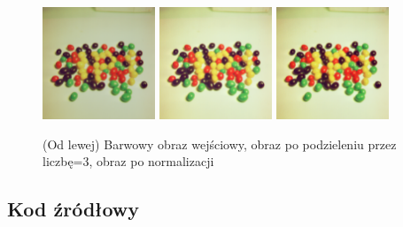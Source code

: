 \documentclass[final,a4paper,openany,12pt]{mwbk}
\begin{document}
\begin{figure}[H]
	\begin{center}
		\includegraphics[width=0.3\textwidth]{2/2Color_Div_Original}
		\includegraphics[width=0.3\textwidth]{2/2Color_Div_Result}
		\includegraphics[width=0.3\textwidth]{2/2Color_Div_Result_Norm}
	\end{center}
	\caption{(Od lewej) Barwowy obraz wejściowy, obraz po podzieleniu przez liczbę=3, obraz po normalizacji }
\end{figure}

\subsection*{Kod źródłowy}
\end{document}
